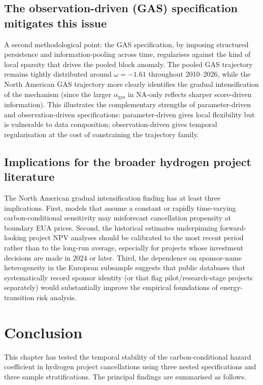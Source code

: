 \documentclass[11pt,a4paper]{article}
\begin{document}
\subsection{The observation-driven (GAS) specification mitigates this issue}

A second methodological point: the GAS specification, by imposing structured persistence and information-pooling across time, regularises against the kind of local sparsity that drives the pooled block anomaly. The pooled GAS trajectory remains tightly distributed around $\omega = -1.61$ throughout 2010--2026, while the North American GAS trajectory more clearly identifies the gradual intensification of the mechanism (since the larger $\alpha_{\mathrm{gas}}$ in NA-only reflects sharper score-driven information). This illustrates the complementary strengths of parameter-driven and observation-driven specifications: parameter-driven gives local flexibility but is vulnerable to data composition; observation-driven gives temporal regularisation at the cost of constraining the trajectory family.

\subsection{Implications for the broader hydrogen project literature}

The North American gradual intensification finding has at least three implications. First, models that assume a constant or rapidly time-varying carbon-conditional sensitivity may misforecast cancellation propensity at boundary EUA prices. Second, the historical estimates underpinning forward-looking project NPV analyses should be calibrated to the most recent period rather than to the long-run average, especially for projects whose investment decisions are made in 2024 or later. Third, the dependence on sponsor-name heterogeneity in the European subsample suggests that public databases that systematically record sponsor identity (or that flag pilot/research-stage projects separately) would substantially improve the empirical foundations of energy-transition risk analysis.

\section{Conclusion}
\label{sec:ch7-conclusion}

This chapter has tested the temporal stability of the carbon-conditional hazard coefficient in hydrogen project cancellations using three nested specifications and three sample stratifications. The principal findings are summarised as follows.
\end{document}
